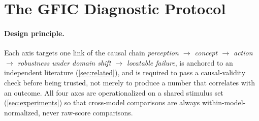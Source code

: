 \section{The GFIC Diagnostic Protocol}
\label{sec:method}

\paragraph{Design principle.}
Each axis targets one link of the causal chain
\emph{perception $\to$ concept $\to$ action $\to$ robustness under domain shift $\to$
locatable failure}, is anchored to an independent literature (\cref{sec:related}), and is
required to pass a causal-validity check before being trusted, not merely to produce a
number that correlates with an outcome. All four axes are operationalized on a shared
stimulus set (\cref{sec:experiments}) so that cross-model comparisons are always
within-model-normalized, never raw-score comparisons.

